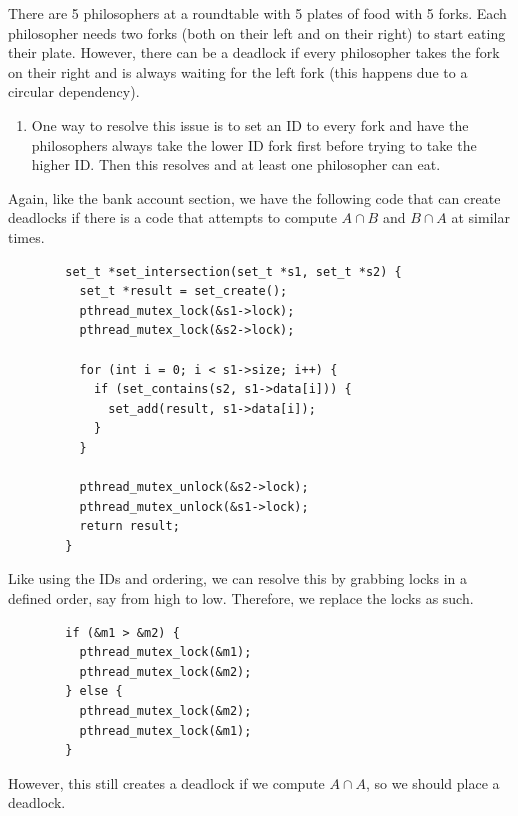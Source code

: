 \documentclass{article}
\newcounter{example}[section]
\newcounter{code}[section]
\begin{document}
    \begin{example}
      \label{ex:dining-philosophers-problem}
      There are 5 philosophers at a roundtable with 5 plates of food with 5 forks. Each philosopher needs two forks (both on their left and on their right) to start eating their plate. However, there can be a deadlock if every philosopher takes the fork on their right and is always waiting for the left fork (this happens due to a circular dependency). 
      \begin{enumerate}
        \item One way to resolve this issue is to set an ID to every fork and have the philosophers always take the lower ID fork first before trying to take the higher ID. Then this resolves and at least one philosopher can eat. 
      \end{enumerate}
    \end{example}

    \begin{example}
      \label{ex:set-intersection-problem}
      Again, like the bank account section, we have the following code that can create deadlocks if there is a code that attempts to compute $A \cap B$ and $B \cap A$ at similar times. 
      \begin{lstlisting}
        set_t *set_intersection(set_t *s1, set_t *s2) {
          set_t *result = set_create(); 
          pthread_mutex_lock(&s1->lock); 
          pthread_mutex_lock(&s2->lock); 

          for (int i = 0; i < s1->size; i++) {
            if (set_contains(s2, s1->data[i])) {
              set_add(result, s1->data[i]); 
            }
          }

          pthread_mutex_unlock(&s2->lock); 
          pthread_mutex_unlock(&s1->lock); 
          return result; 
        }
      \end{lstlisting}
      Like using the IDs and ordering, we can resolve this by grabbing locks in a defined order, say from high to low. Therefore, we replace the locks as such.
      \begin{lstlisting}
        if (&m1 > &m2) {
          pthread_mutex_lock(&m1); 
          pthread_mutex_lock(&m2); 
        } else {
          pthread_mutex_lock(&m2); 
          pthread_mutex_lock(&m1); 
        }
      \end{lstlisting}
      However, this still creates a deadlock if we compute $A \cap A$, so we should place a deadlock. 
    \end{example}
\end{document}
